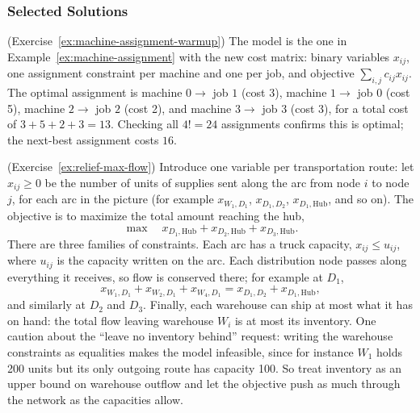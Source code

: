 \subsubsection*{Selected Solutions}

\begin{solution}(Exercise~\ref{ex:machine-assignment-warmup})
The model is the one in Example~\ref{ex:machine-assignment} with the new cost matrix: binary variables $x_{ij}$, one assignment constraint per machine and one per job, and objective $\sum_{i,j} c_{ij} x_{ij}$.  The optimal assignment is machine $0 \to$ job $1$ (cost 3), machine $1 \to$ job $0$ (cost 5), machine $2 \to$ job $2$ (cost 2), and machine $3 \to$ job $3$ (cost 3), for a total cost of $3 + 5 + 2 + 3 = 13$.  Checking all $4! = 24$ assignments confirms this is optimal; the next-best assignment costs $16$.
\end{solution}

\begin{solution}(Exercise~\ref{ex:relief-max-flow})
Introduce one variable per transportation route: let $x_{ij} \geq 0$ be the number of units of supplies sent along the arc from node $i$ to node $j$, for each arc in the picture (for example $x_{W_1,D_1}$, $x_{D_1,D_2}$, $x_{D_1,\text{Hub}}$, and so on).  The objective is to maximize the total amount reaching the hub,
\[
\max \quad x_{D_1,\text{Hub}} + x_{D_2,\text{Hub}} + x_{D_3,\text{Hub}}.
\]
There are three families of constraints.  Each arc has a truck capacity, $x_{ij} \leq u_{ij}$, where $u_{ij}$ is the capacity written on the arc.  Each distribution node passes along everything it receives, so flow is conserved there; for example at $D_1$,
\[
x_{W_1,D_1} + x_{W_2,D_1} + x_{W_4,D_1} = x_{D_1,D_2} + x_{D_1,\text{Hub}},
\]
and similarly at $D_2$ and $D_3$.  Finally, each warehouse can ship at most what it has on hand: the total flow leaving warehouse $W_i$ is at most its inventory.
One caution about the ``leave no inventory behind'' request: writing the warehouse constraints as equalities makes the model infeasible, since for instance $W_1$ holds 200 units but its only outgoing route has capacity 100.  So treat inventory as an upper bound on warehouse outflow and let the objective push as much through the network as the capacities allow.
\end{solution}

